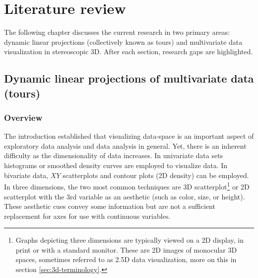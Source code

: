 \documentclass{monashthesis}
\begin{document}
\hypertarget{ch:lit_review}{%
\chapter{Literature review}\label{ch:lit_review}}

The following chapter discusses the current research in two primary areas: dynamic linear projections (collectively known as tours) and multivariate data visualization in stereoscopic 3D. After each section, research gaps are highlighted.

\hypertarget{sec:tour}{%
\section{Dynamic linear projections of multivariate data (tours)}\label{sec:tour}}

\hypertarget{overview}{%
\subsection{Overview}\label{overview}}

The introduction established that visualizing data-space is an important aspect of exploratory data analysis and data analysis in general. Yet, there is an inherent difficulty as the dimensionality of data increases. In univariate data sets histograms or smoothed density curves are employed to visualize data. In bivariate data, \(XY\) scatterplots and contour plots (2D density) can be employed. In three dimensions, the two most common techniques are 3D scatterplot\footnote{Graphs depicting three dimensions are typically viewed on a 2D display, in print or with a standard monitor. These are 2D images of monocular 3D spaces, sometimes referred to as 2.5D data visualization, more on this in section \ref{sec:3d-terminology}.} or 2D scatterplot with the 3rd variable as an aesthetic (such as color, size, or height). These aesthetic cues convey some information but are not a sufficient replacement for axes for use with continuous variables.
\end{document}
